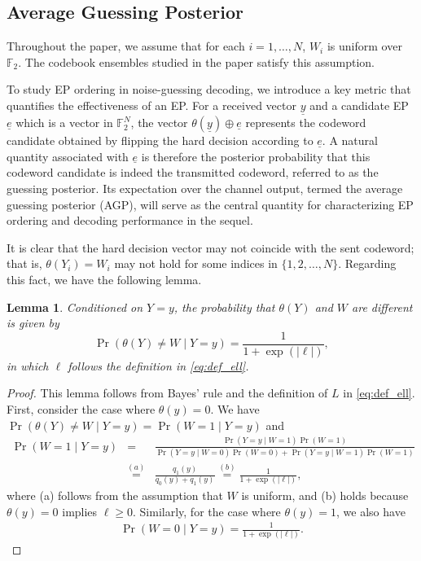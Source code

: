 \documentclass[letterpaper,draftclsnofoot,onecolumn]{IEEEtran}
\newtheorem{lemma}{Lemma}
\begin{document}
\subsection{Average Guessing Posterior}\label{SubSec:average_guessing_posterior}

Throughout the paper, we assume that for each $i = 1, \ldots, N$, $W_i$ is uniform over $\mathbb{F}_2$. The codebook ensembles studied in the paper satisfy this assumption.

To study EP ordering in noise-guessing decoding, we introduce a key metric that quantifies the effectiveness of an EP. For a received vector $\underline{y}$ and a candidate EP $\underline{e}$ which is a vector in $\mathbb{F}_2^N$, the vector $\theta(\underline{y})\oplus \underline{e}$ represents the codeword candidate obtained by flipping the hard decision according to $\underline{e}$. A natural quantity associated with $\underline{e}$ is therefore the posterior probability that this codeword candidate is indeed the transmitted codeword, referred to as the guessing posterior. Its expectation over the channel output, termed the average guessing posterior (AGP), will serve as the central quantity for characterizing EP ordering and decoding performance in the sequel.

It is clear that the hard decision vector may not coincide with the sent codeword; that is, $\theta(Y_i) = W_i$ may not hold for some indices in $\{1, 2, \ldots, N\}$. Regarding this fact, we have the following lemma.

\begin{lemma}\label{lem:y-neq-w-cond-ell}
    Conditioned on $Y = y$, the probability that $\theta(Y)$ and $W$ are different is given by
    \begin{equation}\label{eq:p_error}
    \Pr(\theta(Y) \neq W \mid Y = y) = \frac{1}{1 + \exp(|\ell|)},
\end{equation}
in which $\ell$ follows the definition in \eqref{eq:def_ell}.
\end{lemma}
\begin{proof}
    This lemma follows from Bayes' rule and the definition of $L$ in \eqref{eq:def_ell}. First, consider the case where $\theta(y) = 0$. We have $\Pr(\theta(Y) \neq W \mid Y = y) = \Pr(W = 1 \mid Y = y)$ and 
    \begin{eqnarray}
        \Pr(W = 1 \mid Y = y) &=& \frac{\Pr(Y = y \mid W = 1) \Pr(W = 1)}{\Pr(Y = y \mid W = 0) \Pr(W = 0) + \Pr(Y = y \mid W = 1) \Pr(W = 1)}\\
        &\overset{(a)}{ = }& \frac{q_1(y)}{q_0(y) + q_1(y)}  \overset{(b)}{ = } \frac{1}{1 + \exp(|\ell|)},
    \end{eqnarray}
    where (a) follows from the assumption that $W$ is uniform, and (b) holds because $\theta(y) = 0$ implies $\ell \geq 0$. Similarly, for the case where $\theta(y) = 1$, we also have
    \begin{eqnarray}
        \Pr(W = 0 \mid Y = y) = \frac{1}{1 + \exp(|\ell|)}.
    \end{eqnarray}
\end{proof}
\end{document}
